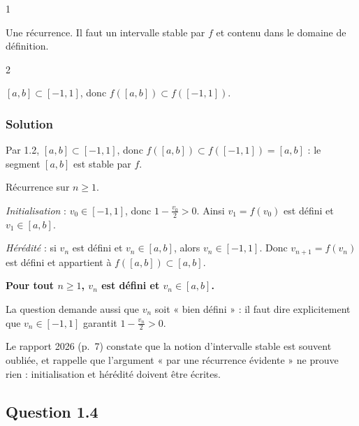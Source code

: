 \documentclass[11pt,a4paper]{article}
\begin{document}
\begin{indication}{1}

Une récurrence. Il faut un intervalle stable par \(f\) et contenu dans le domaine de définition.

\end{indication}

\begin{indication}{2}

\([a,b]\subset[-1,1]\), donc \(f([a,b])\subset f([-1,1])\).

\end{indication}

\hypertarget{solution-15}{%
\subsubsection{Solution}\label{solution-15}}

Par 1.2, \([a,b]\subset[-1,1]\), donc \(f([a,b])\subset f([-1,1])=[a,b]\) : le segment \([a,b]\) est stable par \(f\).

Récurrence sur \(n\ge1\).

\emph{Initialisation} : \(v_0\in[-1,1]\), donc \(1-\frac{v_0}2>0\). Ainsi \(v_1=f(v_0)\) est défini et \(v_1\in[a,b]\).

\emph{Hérédité} : si \(v_n\) est défini et \(v_n\in[a,b]\), alors \(v_n\in[-1,1]\). Donc \(v_{n+1}=f(v_n)\) est défini et appartient à \(f([a,b])\subset[a,b]\).

\textbf{Pour tout \(n\ge1\), \(v_n\) est défini et \(v_n\in[a,b]\).}

\begin{piege}

La question demande aussi que \(v_n\) soit « bien défini » : il faut dire explicitement que \(v_n\in[-1,1]\) garantit \(1-\frac{v_n}2>0\).

\end{piege}

\begin{jury}

Le rapport 2026 (p.~7) constate que la notion d'intervalle stable est souvent oubliée, et rappelle que l'argument « par une récurrence évidente » ne prouve rien : initialisation et hérédité doivent être écrites.

\end{jury}

\hypertarget{question-1.4}{%
\subsection{Question 1.4}\label{question-1.4}}
\end{document}
